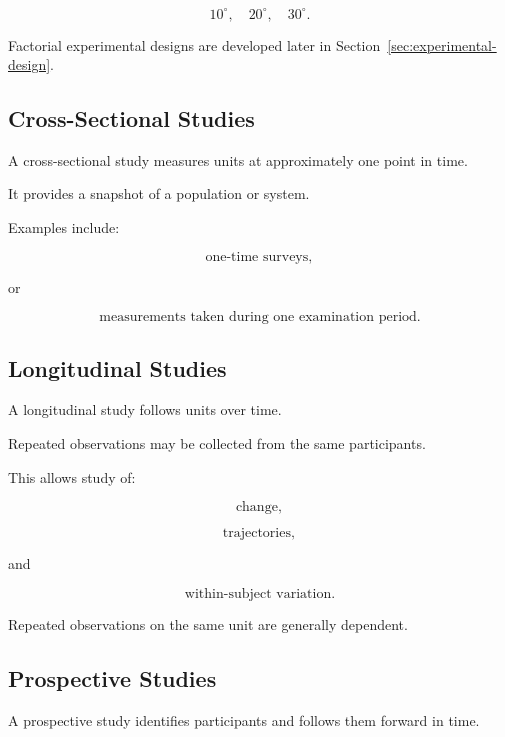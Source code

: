 \[
10^\circ,
\quad
20^\circ,
\quad
30^\circ.
\]

Factorial experimental designs are developed later in
Section~\ref{sec:experimental-design}.

\subsection{Cross-Sectional Studies}
\label{subsec:cross-sectional-studies}

A cross-sectional study measures units at approximately one point in
time.

It provides a snapshot of a population or system.

Examples include:

\[
\text{one-time surveys},
\]

or

\[
\text{measurements taken during one examination period}.
\]

\subsection{Longitudinal Studies}
\label{subsec:longitudinal-studies}

A longitudinal study follows units over time.

Repeated observations may be collected from the same participants.

This allows study of:

\[
\boxed{
\text{change},
}
\]

\[
\boxed{
\text{trajectories},
}
\]

and

\[
\boxed{
\text{within-subject variation}.
}
\]

Repeated observations on the same unit are generally dependent.

\subsection{Prospective Studies}
\label{subsec:prospective-studies}

A prospective study identifies participants and follows them forward in
time.

